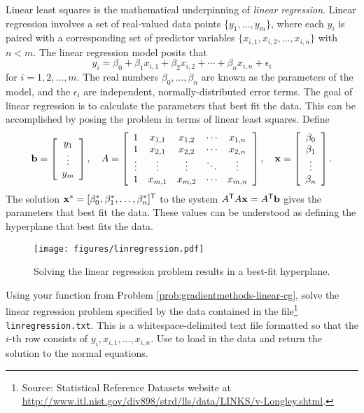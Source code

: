 Linear least squares is the mathematical underpinning of \emph{linear regression}.
Linear regression involves a set of real-valued data points \{$y_1,\ldots, y_m\}$, where each
$y_i$ is paired with a corresponding set of predictor variables $\{x_{i,1}, x_{i,2}, \ldots, x_{i,n}\}$ with $n < m$.
The linear regression model posits that
\[
y_i = \beta_0 + \beta_1 x_{i,1} + \beta_2 x_{i,2} + \cdots + \beta_n x_{i,n} + \epsilon_i
\]
for $i = 1, 2, \ldots, m$.
The real numbers $\beta_0,\ldots,\beta_n$ are known as the parameters of the model, and the $\epsilon_i$ are independent, normally-distributed error terms.
The goal of linear regression is to calculate the parameters that best fit the data.
This can be accomplished by posing the problem in terms of linear least squares.
Define
\[
\mathbf{b} = \left[\begin{array}{c}y_1 \\ \vdots \\ y_m\end{array}\right],
\quad
A =
\left[\begin{array}{ccccc}
1 & x_{1,1} & x_{1,2} & \cdots & x_{1,n}\\
1 & x_{2,1} & x_{2,2} & \cdots & x_{2,n}\\
\vdots & \vdots & \vdots & \ddots & \vdots\\
1 & x_{m,1} & x_{m,2} & \cdots & x_{m,n}
\end{array}\right],
\quad
\mathbf{x} = \left[\begin{array}{c}
    \beta_0 \\ \beta_1 \\ \vdots \\ \beta_n
\end{array}\right].
\]
The solution $\mathbf{x}^* = [\beta_0^*, \beta_1^*, \ldots, \beta_n^*]^{\mathsf T}$ to the system $A^{\mathsf T} A\mathbf{x} = A^{\mathsf T}\mathbf{b}$ gives the parameters that best fit the data.
These values can be understood as defining the hyperplane that best fits the data.

\begin{figure}[H]
\centering
\texttt{[image: figures/linregression.pdf]}
\caption{Solving the linear regression problem results in a best-fit hyperplane.}
\label{fig:linregression}
\end{figure}

\begin{problem}
Using your function from Problem \ref{prob:gradientmethods-linear-cg}, solve the linear regression problem specified by the data contained in the file\footnote{Source: Statistical Reference Datasets website at \url{http://www.itl.nist.gov/div898/strd/lls/data/LINKS/v-Longley.shtml}.}
\texttt{linregression.txt}.
This is a whitespace-delimited text file formatted so that the $i$-th row consists of $y_i, x_{i,1}, \ldots, x_{i,n}$.
Use  to load in the data and return the solution to the normal equations.
\end{problem}


